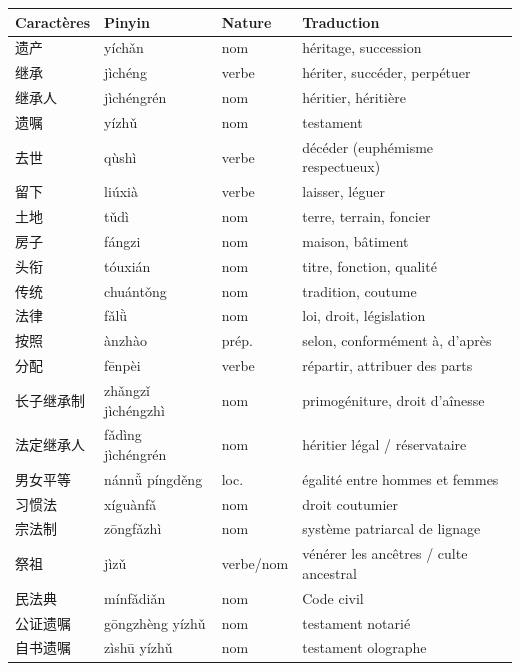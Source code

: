 \documentclass[11pt]{article}
\begin{document}
\begin{center}
\begin{tabularx}{\linewidth}{|X|X|X|X|}
\hline
\rowcolor{popblueL} Caractères & Pinyin & Nature & Traduction \\
\hline
遗产 & yíchǎn & nom & héritage, succession \\
\hline
继承 & jìchéng & verbe & hériter, succéder, perpétuer \\
\hline
继承人 & jìchéngrén & nom & héritier, héritière \\
\hline
遗嘱 & yízhǔ & nom & testament \\
\hline
去世 & qùshì & verbe & décéder (euphémisme respectueux) \\
\hline
留下 & liúxià & verbe & laisser, léguer \\
\hline
土地 & tǔdì & nom & terre, terrain, foncier \\
\hline
房子 & fángzi & nom & maison, bâtiment \\
\hline
头衔 & tóuxián & nom & titre, fonction, qualité \\
\hline
传统 & chuántǒng & nom & tradition, coutume \\
\hline
法律 & fǎlǜ & nom & loi, droit, législation \\
\hline
按照 & ànzhào & prép. & selon, conformément à, d'après \\
\hline
分配 & fēnpèi & verbe & répartir, attribuer des parts \\
\hline
长子继承制 & zhǎngzǐ jìchéngzhì & nom & primogéniture, droit d'aînesse \\
\hline
法定继承人 & fǎdìng jìchéngrén & nom & héritier légal / réservataire \\
\hline
男女平等 & nánnǚ píngděng & loc. & égalité entre hommes et femmes \\
\hline
习惯法 & xíguànfǎ & nom & droit coutumier \\
\hline
宗法制 & zōngfǎzhì & nom & système patriarcal de lignage \\
\hline
祭祖 & jìzǔ & verbe/nom & vénérer les ancêtres / culte ancestral \\
\hline
民法典 & mínfǎdiǎn & nom & Code civil \\
\hline
公证遗嘱 & gōngzhèng yízhǔ & nom & testament notarié \\
\hline
自书遗嘱 & zìshū yízhǔ & nom & testament olographe \\
\hline
\end{tabularx}
\end{center}
\end{document}
